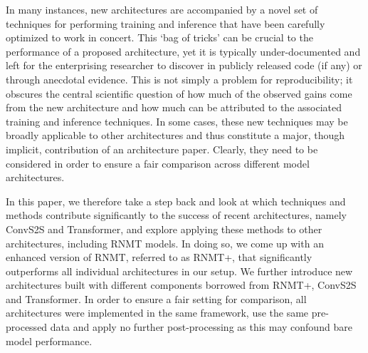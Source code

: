 \documentclass[11pt,a4paper]{article}
\begin{document}
In many instances, new architectures are accompanied by a novel set of
techniques for performing training and inference that have been carefully
optimized to work in concert. This `bag of tricks' can be crucial to the
performance of a proposed architecture, yet it is typically under-documented and
left for the enterprising researcher to discover in publicly released code (if
any) or through anecdotal evidence. This is not simply a problem for
reproducibility; it obscures the central scientific question of how much of the
observed gains come from the new architecture and how much can be
attributed to the associated training and inference techniques. In
some cases, these new techniques may be broadly applicable to other
architectures and thus constitute a major, though implicit, contribution
of an architecture paper. Clearly, they need to be considered in order
to ensure a fair comparison across different model architectures.

In this paper, we therefore take a step back and look at which
techniques and methods contribute
significantly to the success of recent architectures, namely ConvS2S and
Transformer, and explore applying
these methods to other architectures, including RNMT models.
In doing so, we come up with an enhanced version of RNMT, referred to as RNMT+,
that significantly outperforms all individual architectures in our setup.
We further introduce new
architectures built with different components borrowed from
RNMT+, ConvS2S and Transformer.
In order to ensure a fair setting for comparison, all architectures
were implemented in the same framework, use the same
pre-processed data and apply no further post-processing as this may
confound bare model performance.
\end{document}
